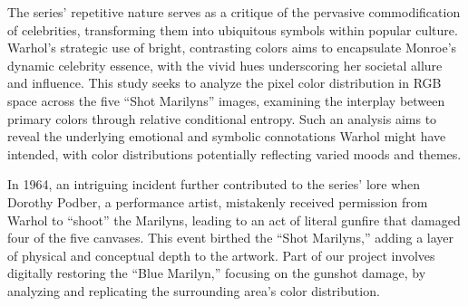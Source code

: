 \documentclass{article}
\begin{document}
The series' repetitive nature serves as a critique of the pervasive
commodification of celebrities, transforming them into ubiquitous
symbols within popular culture. Warhol's strategic use of bright,
contrasting colors aims to encapsulate Monroe's dynamic celebrity
essence, with the vivid hues underscoring her societal allure and
influence. This study seeks to analyze the pixel color distribution in
RGB space across the five ``Shot Marilyns'' images, examining the
interplay between primary colors through relative conditional entropy.
Such an analysis aims to reveal the underlying emotional and symbolic
connotations Warhol might have intended, with color distributions
potentially reflecting varied moods and themes.

In 1964, an intriguing incident further contributed to the series' lore
when Dorothy Podber, a performance artist, mistakenly received
permission from Warhol to ``shoot'' the Marilyns, leading to an act of
literal gunfire that damaged four of the five canvases. This event
birthed the ``Shot Marilyns,'' adding a layer of physical and conceptual
depth to the artwork. Part of our project involves digitally restoring
the ``Blue Marilyn,'' focusing on the gunshot damage, by analyzing and
replicating the surrounding area's color distribution.
\end{document}
